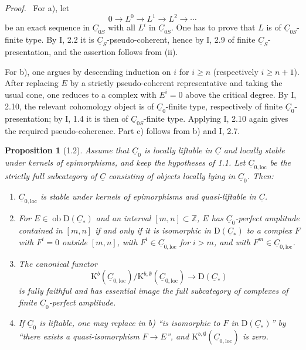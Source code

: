 \documentclass[13pt]{extarticle}
\newcommand{\ZZ}{\mathbb Z}
\newcommand{\uC}{\underline C}
\newcommand{\D}{\mathrm D}
\newcommand{\K}{\mathrm K}
\newcommand{\ob}{\operatorname{ob}}
\newenvironment{prooftext}[1][Proof]{\par\noindent\emph{#1.}\ }{\par\medskip}
\newtheorem*{proposition*}{Proposition}
\begin{document}
\begin{prooftext}
For a), let
\[
0\longrightarrow L^0\longrightarrow L^1\longrightarrow L^2\longrightarrow\cdots
\]
be an exact sequence in $\uC_{0S}$ with all $L^i$ in $\uC_{0S}$. One has to prove that $L$ is of $\uC_{0S}$-finite type. By I, 2.2 it is $\uC_S$-pseudo-coherent, hence by I, 2.9 of finite $\uC_S$-presentation, and the assertion follows from (ii).

For b), one argues by descending induction on $i$ for $i\ge n$ (respectively $i\ge n+1$). After replacing $E$ by a strictly pseudo-coherent representative and taking the usual cone, one reduces to a complex with $E^i=0$ above the critical degree. By I, 2.10, the relevant cohomology object is of $\uC_0$-finite type, respectively of finite $\uC_0$-presentation; by I, 1.4 it is then of $\uC_{0S}$-finite type. Applying I, 2.10 again gives the required pseudo-coherence. Part c) follows from b) and I, 2.7.
\end{prooftext}

\begin{proposition*}[1.2]
Assume that $\uC_0$ is locally liftable in $\uC$ and locally stable under kernels of epimorphisms, and keep the hypotheses of 1.1. Let $\uC_{0,\mathrm{loc}}$ be the strictly full subcategory of $\uC$ consisting of objects locally lying in $\uC_0$. Then:
\begin{enumerate}[label=\alph*)]
\item $\uC_{0,\mathrm{loc}}$ is stable under kernels of epimorphisms and quasi-liftable in $\uC$.
\item For $E\in\ob\D(\uC_*)$ and an interval $[m,n]\subset\ZZ$, $E$ has $\uC_0$-perfect amplitude contained in $[m,n]$ if and only if it is isomorphic in $\D(\uC_*)$ to a complex $F$ with $F^i=0$ outside $[m,n]$, with $F^i\in\uC_{0,\mathrm{loc}}$ for $i>m$, and with $F^m\in\uC_{0,\mathrm{loc}}$.
\item The canonical functor
\[
\K^b(\uC_{0,\mathrm{loc}})/\K^{b,\emptyset}(\uC_{0,\mathrm{loc}})
\longrightarrow \D(\uC_*)
\]
is fully faithful and has essential image the full subcategory of complexes of finite $\uC_0$-perfect amplitude.
\item If $\uC_0$ is liftable, one may replace in b) ``is isomorphic to $F$ in $\D(\uC_*)$'' by ``there exists a quasi-isomorphism $F\to E$'', and $\K^{b,\emptyset}(\uC_{0,\mathrm{loc}})$ is zero.
\end{enumerate}
\end{proposition*}
\end{document}
